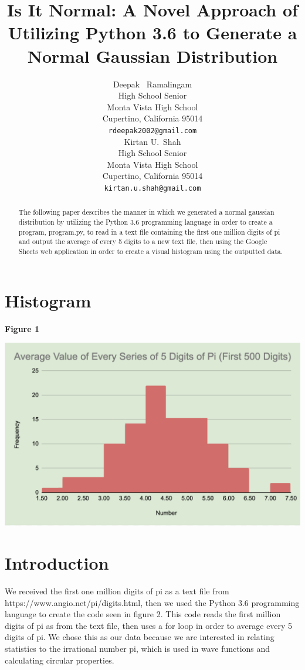 \documentclass{article}
\title{Is It Normal: A Novel Approach of Utilizing Python 3.6 to Generate a Normal Gaussian Distribution}
\author{
  Deepak ~Ramalingam \\
  High School Senior \\
  Monta Vista High School\\
  Cupertino, California 95014 \\
  \texttt{rdeepak2002@gmail.com} \\
   \And
 Kirtan U.~Shah \\
  High School Senior\\
  Monta Vista High School\\
  Cupertino, California 95014 \\
  \texttt{kirtan.u.shah@gmail.com} \\
}
\begin{document}
\maketitle

\begin{abstract}
The following paper describes the manner in which we generated a normal gaussian distribution by utilizing the Python 3.6 programming language in order to create a program, program.py, to read in a text file containing the first one million digits of pi and output the average of every 5 digits to a new text file, then using the Google Sheets web application in order to create a visual histogram using the outputted data.
\end{abstract}

\section{Histogram}

\centerline{\textbf{Figure 1}}

\includegraphics[width=\textwidth]{histogram.png}

\section{Introduction}
We received the first one million digits of pi as a text file from https://www.angio.net/pi/digits.html, then we used the Python 3.6 programming language to create the code seen in figure 2. This code reads the first million digits of pi as from the text file, then uses a for loop in order to average every 5 digits of pi. We chose this as our data because we are interested in relating statistics to the irrational number pi, which is used in wave functions and calculating circular properties. 
\end{document}
